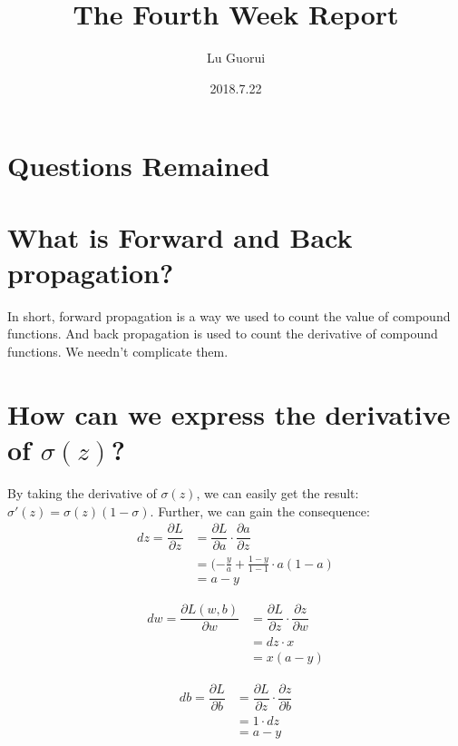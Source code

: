 \documentclass[10pt]{article}
\title{The Fourth Week Report}
\author{Lu Guorui}
\date{2018.7.22}
\begin{document}
\maketitle
\renewcommand{\contentsname}{Contents}
\tableofcontents
\newpage

\section*{Questions Remained}

\section{What is Forward and Back propagation?}
\indent In short, forward propagation is a way we used to count the value of compound functions. And back propagation is used to count the derivative of compound functions. We needn't complicate them.

\section{How can we express the derivative of $\sigma(z)$?}
\indent By taking the derivative of $\sigma(z)$, we can easily get the result:$\sigma'(z)=\sigma(z)(1-\sigma)$.
\indent Further, we can gain the consequence:
\begin{align}
dz = \dfrac{\partial L}{\partial z} &= \dfrac{\partial L}{\partial a}\cdot\dfrac{\partial a}{\partial z}  \\
&= (-\frac{y}{a}+\frac{1-y}{1-1}\cdot a(1-a) \\
&= a-y
\end{align}

\begin{align}
dw = \dfrac{\partial L(w,b)}{\partial w}&=\dfrac{\partial L}{\partial z}\cdot\dfrac{\partial z}{\partial w} \\
&=dz\cdot x  \\
&=x(a-y) 
\end{align}

\begin{align}
db = \dfrac{\partial L}{\partial b} &=\dfrac{\partial L}{\partial z}\cdot\dfrac{\partial z}{\partial b}  \\
&= 1\cdot dz \\
&= a-y
\end{align}

\hypersetup{
	bookmarks=true,
	colorlinks=true,
	linkcolor=red
	}
\end{document}
